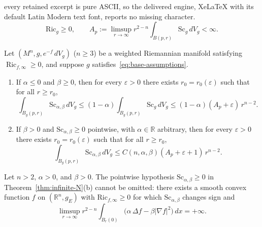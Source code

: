 \documentclass[10pt,a4paper]{amsart}
\begin{document}
every retained excerpt is pure ASCII, so the delivered engine, XeLaTeX with its default Latin Modern text font, reports no missing character.
\begin{equation}\label{eq:base-assumptions}
  \mathrm{Ric}_g\geq 0,
  \qquad
  A_p:=\limsup_{r\to\infty}
  r^{2-n}\int_{B(p,r)}\mathrm{Sc}_g\,dV_g<\infty.
\end{equation}

\begin{theorem}
\label{thm:infinite-N}
Let $(M^n,g,e^{-f}\,dV_g)$ ($n\geq 3$)  be a weighted Riemannian manifold
satisfying $\operatorname{Ric}_{f,\infty}\ge 0$, and suppose $g$
satisfies~\eqref{eq:base-assumptions}.
\begin{enumerate}
\item[\textup{(a)}] If $\alpha\le 0$ and $\beta\ge 0$, then for every
$\varepsilon>0$ there exists $r_0=r_0(\varepsilon)$ such that for all
$r\ge r_0$,
\begin{equation}\label{eq:infty-signed-upper}
  \int_{B_g(p,r)}\mathrm{Sc}_{\alpha,\beta}\,dV_g
  \le(1-\alpha)\int_{B_g(p,r)}\mathrm{Sc}_g\,dV_g
  \le(1-\alpha)(A_p+\varepsilon)\,r^{n-2}.
\end{equation}

\item[\textup{(b)}] If $\beta>0$ and $\mathrm{Sc}_{\alpha,\beta}\ge 0$
pointwise, with $\alpha\in\mathbb{R}$ arbitrary, then for every $\varepsilon>0$
there exists $r_0=r_0(\varepsilon)$ such that for all $r\ge r_0$,
\begin{equation}\label{eq:infty-positive-beta}
  \int_{B_g(p,r)}\mathrm{Sc}_{\alpha,\beta}\,dV_g
  \le C(n,\alpha,\beta)(A_p+\varepsilon+1)\,r^{n-2}.
\end{equation}
\end{enumerate}
\end{theorem}

\begin{proposition}
\label{prop:sign-needed-beta-positive}
Let $n>2$, $\alpha>0$, and $\beta>0$. The pointwise hypothesis
$\mathrm{Sc}_{\alpha,\beta}\ge 0$ in Theorem~\ref{thm:infinite-N}\textup{(b)}
cannot be omitted: there exists a smooth convex function $f$ on
$(\mathbb{R}^n,g_{E})$ with $\mathrm{Ric}_{f,\infty}\ge 0$
for which $\mathrm{Sc}_{\alpha,\beta}$ changes sign and
\[
  \limsup_{r\to\infty}r^{2-n}
  \int_{B_r(0)}\bigl(\alpha\,\Delta f-\beta|\nabla f|^2\bigr)\,dx=+\infty.
\]
\end{proposition}
\end{document}
